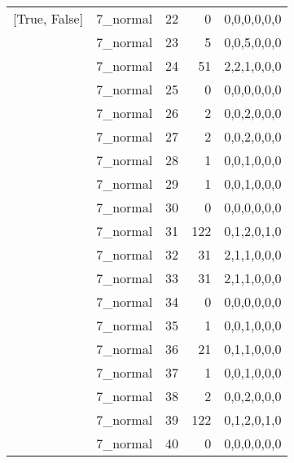 \begin{tabular}{llrrl}
 [True, False]   & 7\_normal            &            22 &                     0 & 0,0,0,0,0,0   \\
 [True, False]   & 7\_normal            &            23 &                     5 & 0,0,5,0,0,0   \\
 [True, False]   & 7\_normal            &            24 &                    51 & 2,2,1,0,0,0   \\
 [True, False]   & 7\_normal            &            25 &                     0 & 0,0,0,0,0,0   \\
 [True, False]   & 7\_normal            &            26 &                     2 & 0,0,2,0,0,0   \\
 [True, False]   & 7\_normal            &            27 &                     2 & 0,0,2,0,0,0   \\
 [True, False]   & 7\_normal            &            28 &                     1 & 0,0,1,0,0,0   \\
 [True, False]   & 7\_normal            &            29 &                     1 & 0,0,1,0,0,0   \\
 [True, False]   & 7\_normal            &            30 &                     0 & 0,0,0,0,0,0   \\
 [True, False]   & 7\_normal            &            31 &                   122 & 0,1,2,0,1,0   \\
 [True, False]   & 7\_normal            &            32 &                    31 & 2,1,1,0,0,0   \\
 [True, False]   & 7\_normal            &            33 &                    31 & 2,1,1,0,0,0   \\
 [True, False]   & 7\_normal            &            34 &                     0 & 0,0,0,0,0,0   \\
 [True, False]   & 7\_normal            &            35 &                     1 & 0,0,1,0,0,0   \\
 [True, False]   & 7\_normal            &            36 &                    21 & 0,1,1,0,0,0   \\
 [True, False]   & 7\_normal            &            37 &                     1 & 0,0,1,0,0,0   \\
 [True, False]   & 7\_normal            &            38 &                     2 & 0,0,2,0,0,0   \\
 [True, False]   & 7\_normal            &            39 &                   122 & 0,1,2,0,1,0   \\
 [True, False]   & 7\_normal            &            40 &                     0 & 0,0,0,0,0,0   \\

\end{tabular}
